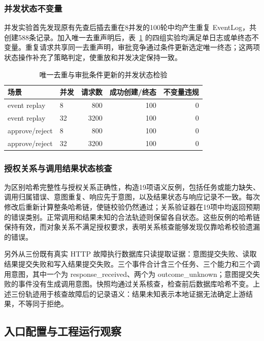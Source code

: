 \subsubsection{并发状态不变量}

并发实验首先发现原有先查后插去重在8并发的100轮中均产生重复 EventLog，共创建588条记录。加入唯一去重声明后，表~\ref{tab:concurrency-v11} 的四组实验均满足单日志或单终态不变量。重复请求共享同一去重声明，审批竞争通过条件更新选定唯一终态；这两项状态操作补充了策略判定，使重放和并发决定保持一致。

\begin{table}[htbp]
\centering
\caption{唯一去重与审批条件更新的并发状态检验}
\label{tab:concurrency-v11}
\small
\begin{tabular}{llrrr}
\toprule
场景 & 并发 & 请求数 & 成功创建/终态 & 不变量违规 \\
\midrule
event replay & 8 & 800 & 100 & 0 \\
event replay & 32 & 3200 & 100 & 0 \\
approve/reject & 8 & 800 & 100 & 0 \\
approve/reject & 32 & 3200 & 100 & 0 \\
\bottomrule
\end{tabular}
\end{table}

\subsubsection{授权关系与调用结果状态核查}
\label{sec:evidence-rr022}

为区别哈希完整性与授权关系正确性，构造19项语义反例，包括任务或能力缺失、调用归属错误、意图重复、响应先于意图，以及结果状态与响应记录不一致。每次修改后重新计算整条哈希链，使链校验仍然通过；关系验证器在19项中均返回预期的错误类别。正常调用和结果未知的合法轨迹则保留各自状态。这些反例的哈希链保持有效，而对象关系不满足授权要求，表明关系核查能够发现仅靠哈希校验遗漏的错误。

另外从三份既有真实 HTTP 故障执行数据库只读提取证据：意图提交失败、读取结果提交失败和写入结果提交失败。三个事件合计含三个任务、三个能力和三个调用意图，其中一个为 response\_received、两个为 outcome\_unknown；意图提交失败的事件没有生成调用意图。快照均通过关系核查，检查前后数据库哈希不变。上述三份轨迹用于核查故障后的记录语义：结果未知表示本地证据无法确定上游结果，不等同于拒绝。

\subsection{入口配置与工程运行观察}
\label{sec:engineering-rr022}

